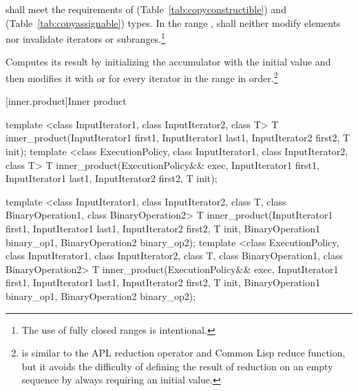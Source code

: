 \documentclass[ebook,11pt,article]{memoir}
\begin{document}
\begin{itemdescr}
\pnum
\requires
{} shall meet the requirements of  (Table~\ref{tab:copyconstructible})
and  (Table~\ref{tab:copyassignable}) types.
In the range
,
shall neither modify elements nor invalidate iterators or subranges.\footnote{The use of fully closed ranges is intentional.}

\pnum
\effects
Computes its result by initializing the accumulator
with the initial value
and then modifies it with
\added{\tcode{)}}
or
\added{\tcode{)}}
for every iterator
in the range 
in order.\footnote{
is similar to the APL reduction operator and Common Lisp reduce function, but
it avoids the difficulty of defining the result of reduction on an empty
sequence by always requiring an initial value.}
\end{itemdescr}


[inner.product]{Inner product}

%
\begin{itemdecl}
template <class InputIterator1, class InputIterator2, class T>
  T inner_product(InputIterator1 first1, InputIterator1 last1,
                  InputIterator2 first2, T init);
template <class ExecutionPolicy, class InputIterator1, class InputIterator2, class T>
  T inner_product(ExecutionPolicy&& exec,
                  InputIterator1 first1, InputIterator1 last1,
                  InputIterator2 first2, T init);

template <class InputIterator1, class InputIterator2, class T,
          class BinaryOperation1, class BinaryOperation2>
  T inner_product(InputIterator1 first1, InputIterator1 last1,
                  InputIterator2 first2, T init,
                  BinaryOperation1 binary_op1,
                  BinaryOperation2 binary_op2);
template <class ExecutionPolicy, class InputIterator1, class InputIterator2, class T,
          class BinaryOperation1, class BinaryOperation2>
  T inner_product(ExecutionPolicy&& exec,
                  InputIterator1 first1, InputIterator1 last1,
                  InputIterator2 first2, T init,
                  BinaryOperation1 binary_op1,
                  BinaryOperation2 binary_op2);
\end{itemdecl}
\end{document}
